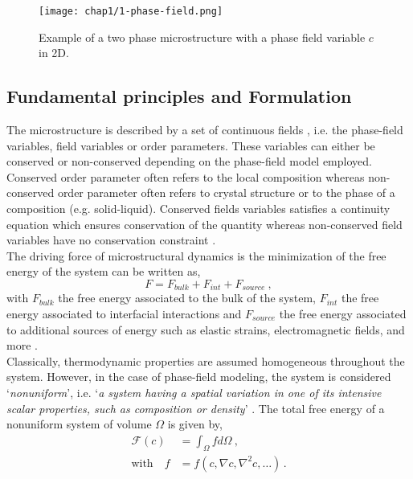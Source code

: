     \begin{figure}[H]
        \centering
        \texttt{[image: chap1/1-phase-field.png]}
        \caption{Example of a two phase microstructure with a phase field variable $c$ in 2D. \cite{LeeHuhJeongShinYunKim2014}}
        \label{fig:1-phase-field}
    \end{figure}
\subsection{Fundamental principles and Formulation}
    The microstructure is described by a set of continuous fields \cite{LeeHuhJeongShinYunKim2014,Voorhees2018,Cahn1961,Biner2017-1,CahnHilliard1958,Cahn1959}, i.e. the phase-field variables, field variables or order parameters. These variables can either be conserved or non-conserved depending on the phase-field model employed. Conserved order parameter often refers to the local composition whereas non-conserved order parameter often refers to crystal structure or to the phase of a composition (e.g. solid-liquid). Conserved fields variables satisfies a continuity equation which ensures conservation of the quantity whereas non-conserved field variables have no conservation constraint \cite{CahnHilliard1958,Cahn1959}.\\
    The driving force of microstructural dynamics is the minimization of the free energy of the system \cite{MoelansBlanpainWollants2008,Voorhees2018,CahnHilliard1958,Cahn1959} can be written as,
    \begin{equation}
        F = F_{bulk} + F_{int} + F_{source}\ ,
    \end{equation}
    with $F_{bulk}$ the free energy associated to the bulk of the system, $F_{int}$ the free energy associated to interfacial interactions and $F_{source}$ the free energy associated to additional sources of energy such as elastic strains, electromagnetic fields, and more \cite{Voorhees2018,MoelansBlanpainWollants2008}.\\
    Classically, thermodynamic properties are assumed homogeneous throughout the system. However, in the case of phase-field modeling, the system is considered `\textit{nonuniform}', i.e. `\textit{a system having a spatial variation in one of its intensive scalar properties, such as composition or density}' \cite{CahnHilliard1958}. The total free energy of a nonuniform system of volume $\Omega$ is given by,
    \begin{equation}
        \begin{aligned}
            \mathcal{F}(c) &= \int_{\Omega} f d\Omega \ ,\\
            \text{with} \quad f &= f(c, \nabla c, \nabla^2 c, \ldots)\, .
        \end{aligned}
    \end{equation}
